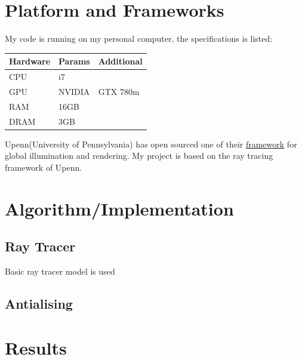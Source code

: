\documentclass[11pt]{article}
\begin{document}
\section{Platform and Frameworks}
\label{sec:orgheadline3}

My code is running on my personal computer, the specifications is listed:
\begin{center}
\begin{tabular}{lll}
\hline
\hline
Hardware & Params & Additional\\
\hline
CPU & i7 & \\
GPU & NVIDIA & GTX 780m\\
RAM & 16GB & \\
DRAM & 3GB & \\
\hline
\end{tabular}
\end{center}

Upenn(University of Pennsylvania) has open sourced one of their \href{https://cis565-fall-2015.github.io/}{framework}  for 
global illumination and rendering. My project is based on the ray tracing framework
of Upenn.


\section{Algorithm/Implementation}
\label{sec:orgheadline7}

\subsection{Ray Tracer}
\label{sec:orgheadline4}
Basic ray tracer model is used 
\subsection{Antialising}
\label{sec:orgheadline5}

\subsection{}
\label{sec:orgheadline6}

\section{Results}
\label{sec:orgheadline8}
\end{document}
